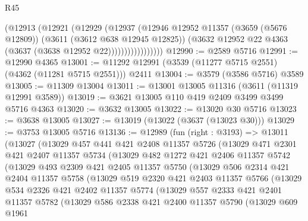 \begin{lexlean}{R45}
\begin{coremodule}
                      (@12913
                        (@12921
                          (@12929
                            (@12937
                              (@12946
                                @12952
                                @11357
                                (@3659 (@5676 @12809))
                                (@3611 (@3612 @638 @12945 @12825))
                                (@3632 @12952 @22 @4363 (@3637 (@3638 @12952 @22)))))))))))))))))
@12990 := @2589 @5716
@12991 := @12990 @4365
@13001 := @11292 @12991 (@3539 (@11277 @5715 @2551) (@4362 (@11281 @5715 @2551))) @2411
@13004 := @3579 (@3586 @5716) @3589
@13005 := @11309 @13004
@13011 := @13001 @13005 @11316 (@3611 (@11319 @12991 @3589))
@13019 := @3621 @13005 @110 @419 @2409 @3499 @3499 @5716 @4363
@13020 := @3632 @13005
@13022 := @13020 @30 @5716
@13023 := @3638 @13005
@13027 := @13019 (@13022 (@3637 (@13023 @30)))
@13029 := @3753 @13005 @5716
@13136 := @12989
    (fun (right : @3193) =>
    @13011
      (@13027
        (@13029
          @457
          @441
          @421
          @2408
          @11357
          @5726
          (@13029
            @471
            @2301
            @421
            @2407
            @11357
            @5734
            (@13029
              @482
              @1272
              @421
              @2406
              @11357
              @5742
              (@13029
                @493
                @2309
                @421
                @2405
                @11357
                @5750
                (@13029
                  @506
                  @2314
                  @421
                  @2404
                  @11357
                  @5758
                  (@13029
                    @519
                    @2320
                    @421
                    @2403
                    @11357
                    @5766
                    (@13029
                      @534
                      @2326
                      @421
                      @2402
                      @11357
                      @5774
                      (@13029
                        @557
                        @2333
                        @421
                        @2401
                        @11357
                        @5782
                        (@13029
                          @586
                          @2338
                          @421
                          @2400
                          @11357
                          @5790
                          (@13029
                            @609
                            @1961

\end{coremodule}
\end{lexlean}
